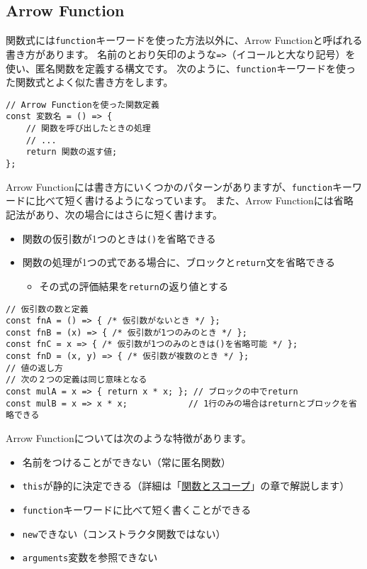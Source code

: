 \hypertarget{arrow-function}{%
\subsection{Arrow Function\protect{}}\label{arrow-function}}

関数式には\texttt{function}キーワードを使った方法以外に、Arrow
Functionと呼ばれる書き方があります。
名前のとおり矢印のような\texttt{=>}（イコールと大なり記号）を使い、匿名関数を定義する構文です。
次のように、\texttt{function}キーワードを使った関数式とよく似た書き方をします。

\begin{lstlisting}
// Arrow Functionを使った関数定義
const 変数名 = () => {
    // 関数を呼び出したときの処理
    // ...
    return 関数の返す値;
};
\end{lstlisting}

Arrow
Functionには書き方にいくつかのパターンがありますが、\texttt{function}キーワードに比べて短く書けるようになっています。
また、Arrow Functionには省略記法があり、次の場合にはさらに短く書けます。

\begin{itemize}
\item
  関数の仮引数が1つのときは\texttt{()}を省略できる
\item
  関数の処理が1つの式である場合に、ブロックと\texttt{return}文を省略できる

  \begin{itemize}
  \item
    その式の評価結果を\texttt{return}の返り値とする
  \end{itemize}
\end{itemize}

\begin{lstlisting}
// 仮引数の数と定義
const fnA = () => { /* 仮引数がないとき */ };
const fnB = (x) => { /* 仮引数が1つのみのとき */ };
const fnC = x => { /* 仮引数が1つのみのときは()を省略可能 */ };
const fnD = (x, y) => { /* 仮引数が複数のとき */ };
// 値の返し方
// 次の２つの定義は同じ意味となる
const mulA = x => { return x * x; }; // ブロックの中でreturn
const mulB = x => x * x;            // 1行のみの場合はreturnとブロックを省略できる
\end{lstlisting}

Arrow Functionについては次のような特徴があります。

\begin{itemize}
\item
  名前をつけることができない（常に匿名関数）
\item
  \texttt{this}が静的に決定できる（詳細は「\hyperlink{function-and-scope}{関数とスコープ}」の章で解説します）
\item
  \texttt{function}キーワードに比べて短く書くことができる
\item
  \texttt{new}できない（コンストラクタ関数ではない）
\item
  \texttt{arguments}変数を参照できない
\end{itemize}

